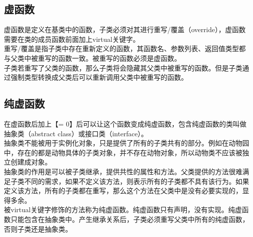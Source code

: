 \subsection{虚函数}

虚函数是定义在基类中的函数，子类必须对其进行重写/覆盖（override），虚函数需要在类的成员函数前面加上virtual关键字。\\

重写/覆盖是指子类中存在重新定义的函数，其函数名、参数列表、返回值类型都与父类中被重写的函数一致。被重写的函数必须是虚函数。\\

子类若重写了父类的函数，那么子类将会隐藏其父类中被重写的函数。但是子类通过强制类型转换成父类后可以重新调用父类中被重写的函数。\\

\subsection{纯虚函数}

在虚函数后加上【= 0】后可以让这个函数变成纯虚函数，包含纯虚函数的类叫做抽象类（abstract class）或接口类（interface）。\\

抽象类不能被用于实例化对象，只是提供了所有的子类共有的部分。例如在动物园中，存在的都是动物具体的子类对象，并不存在动物对象，所以动物类不应该被独立创建成对象。\\

抽象类的作用是可以被子类继承，提供共性的属性和方法。父类提供的方法很难满足子类不同的需求，如果不定义该方法，则表示所有的子类都不具有该行为。如果定义该方法，所有的子类都在重写，那么这个方法在父类中是没有必要实现的，显得多余。\\

被virtual关键字修饰的方法称为纯虚函数。纯虚函数只有声明，没有实现。纯虚函数只能包含在抽象类中。产生继承关系后，子类必须重写父类中所有的纯虚函数，否则子类还是抽象类。\\

\newpage
